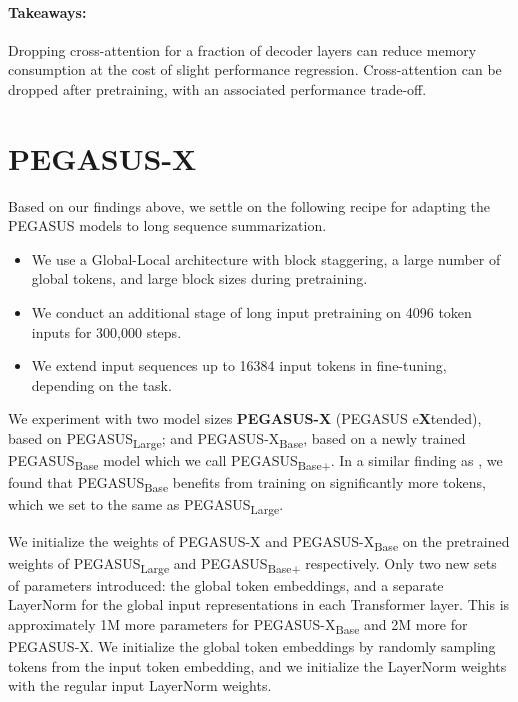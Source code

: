 \documentclass[11pt]{article}
\newcommand{\largemodel}{PEGASUS-X}
\newcommand{\smallmodel}{{PEGASUS-X\textsubscript{Base}}}
\newcommand{\pegasuslarge}{PEGASUS\textsubscript{Large}}
\newcommand{\pegasusbase}{PEGASUS\textsubscript{Base}}
\newcommand{\pegasusbaseplus}{PEGASUS\textsubscript{Base+}}
\begin{document}
\paragraph{Takeaways:} Dropping cross-attention for a fraction of decoder layers can reduce memory consumption at the cost of slight performance regression. Cross-attention can be dropped after pretraining, with an associated performance trade-off.










\section{\largemodel{}}

Based on our findings above, we settle on the following recipe for adapting the PEGASUS models \citep{zhang2019pegasus} to long sequence summarization. 

\begin{itemize}
    \item We use a Global-Local architecture with block staggering, a large number of global tokens, and large block sizes during pretraining.
    \item We conduct an additional stage of long input pretraining on 4096 token inputs for 300,000 steps.
    \item We extend input sequences up to 16384 input tokens in fine-tuning, depending on the task.
\end{itemize}

We experiment with two model sizes \textbf{\largemodel{}} (PEGASUS e\textbf{X}tended), based on \pegasuslarge; and
\smallmodel{}, based on a newly trained \pegasusbase{} model which we call \pegasusbaseplus{}.
In a similar finding as \citet{chinchilla}, we found that \pegasusbase{}  benefits from training on significantly more tokens, which we set to the same as \pegasuslarge{}.

We initialize the weights of \largemodel{} and \smallmodel{} on the pretrained weights of \pegasuslarge{} and \pegasusbaseplus{} respectively.
Only two new sets of parameters introduced: the global token embeddings, and a separate LayerNorm for the global input representations in each Transformer layer.
This is approximately 1M more parameters for \smallmodel{} and 2M more for \largemodel{}.
We initialize the global token embeddings by randomly sampling tokens from the input token embedding, and we initialize the LayerNorm weights with the regular input LayerNorm weights.
\end{document}
